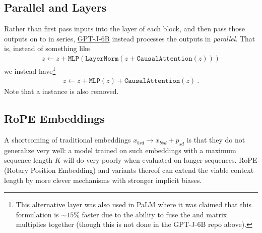 \subsection{Parallel  and  Layers}

Rather than first pass inputs into the  layer of each block, and then pass
those outputs on to  in series, \href{https://github.com/kingoflolz/mesh-transformer-jax/blob/f8315e3003033b23f21d78361b288953064e0e76/mesh_transformer/layers.py#L303}{GPT-J-6B}
instead processes the  outputs in \textit{parallel}. That is, instead of something
like
\begin{align}
	z \leftarrow z + \texttt{MLP}\left ( \texttt{LayerNorm}\left ( z + \texttt{CausalAttention}\left ( z \right ) \right ) \right )
\end{align}
we instead have\footnote{This alternative layer was also used in PaLM \cite{chowdhery2022palm} where it
	was claimed that this formulation is $\sim 15\%$ faster due to the ability to fuse the 
	and  matrix multiplies together (though this is not done in the GPT-J-6B repo above).}
\begin{align}
	z \leftarrow z + \texttt{MLP}\left ( z \right )    + \texttt{CausalAttention}\left ( z \right )\ .
\end{align}
Note that a  instance is also removed.



\subsection{RoPE Embeddings}

A shortcoming of traditional embeddings $ x _{ bsd } \longrightarrow x _{ bsd } + p _{ sd } $ is
that they do not generalize very well: a model trained on such embeddings with a maximum sequence
length $ K $ will do very poorly when evaluated on longer sequences. RoPE (Rotary Position
Embedding) \cite{su2022roformer} and variants thereof can extend the viable context length by more
clever mechanisms with stronger implicit biases.

